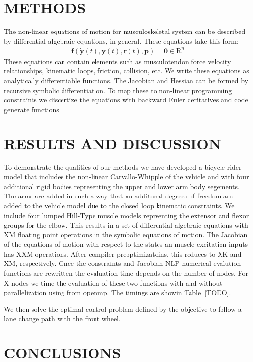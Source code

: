 \documentclass[11pt,twocolumn]{article}
\begin{document}
\section*{METHODS}
%
The non-linear equations of motion for musculoskeletal system can be described
by differential algebraic equations, in general. These equations take this
form:
%
\begin{align}
  \mathbf{f}(\dot{\mathbf{y}}(t), \mathbf{y}(t), \mathbf{r}(t), \mathbf{p}) =
  \mathbf{0} \in \mathrm{R}^n
\end{align}
%
These equations can contain elements such as musculotendon force velocity
relationships, kinematic loops, friction, collision, etc. We write these
equations as analytically differentiable functions. The Jacobian and
Hessian can be formed by recursive symbolic differentiation. To map these to non-linear programming constraints we discertize the equations with backward Euler deritatives and code generate functions

\section*{RESULTS AND DISCUSSION}
%
To demonstrate the qualities of our methods we have developed a bicycle-rider
model that includes the non-linear Carvallo-Whipple of the vehicle and with
four additional rigid bodies representing the upper and lower arm body
segements. The arms are added in such a way that no additonal degrees of
freedom are added to the vehicle model due to the closed loop kinematic
constraints. We include four lumped Hill-Type muscle models reprsenting the
extensor and flexor groups for the elbow. This results in a set of differential
algebraic equations with XM floating point operations in the symbolic equations
of motion. The Jacobian of the equations of motion with respect to the states
an muscle excitation inputs has XXM operations. After compiler
preoptimizatoins, this reduces to XK and XM, respectively. Once the constraints
and Jacobian NLP numerical evalution functions are rewritten the evaluation
time depends on the number of nodes. For X nodes we time the evaluation of
these two functions with and without parallelization using from openmp. The
timings are showin Table~\ref{TODO}.

We then solve the optimal control problem defined by the objective to follow a
lane change path with the front wheel.

\section*{CONCLUSIONS}
\end{document}
